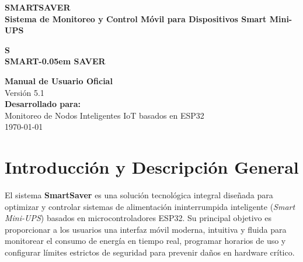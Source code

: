 \documentclass[11pt,a4paper]{article}
\begin{document}

\begin{titlepage}
    \centering
    \vspace*{2cm}
    {\Huge \bfseries \color{primaryblue} SMARTSAVER} \\[0.4cm]
    {\Large \bfseries \color{darkslate} Sistema de Monitoreo y Control Móvil para Dispositivos Smart Mini-UPS} \\[1.5cm]
    \vspace*{0.5cm}
    \begin{tcolorbox}[colback=primaryblue, colframe=primaryblue, width=4cm, height=4cm, arc=15pt, boxrule=0pt, colupper=white, valign=center, halign=center]
        \centering
        \vspace*{0.5cm}
        {\Huge \bfseries S} \\[0.1cm]
        {\small \bfseries SMART\kern-0.05em SAVER}
    \end{tcolorbox}
    \vspace*{1.5cm}
    
    {\large \textbf{Manual de Usuario Oficial}} \\[0.5cm]
    {\large Versión 5.1} \\[2cm]
    
    \textbf{Desarrollado para:} \\
    Monitoreo de Nodos Inteligentes IoT basados en ESP32 \\[1cm]
    
    \vfill
    {\large \today}
\end{titlepage}

\newpage
\tableofcontents
\newpage
{}

\section{Introducción y Descripción General}
El sistema \textbf{SmartSaver} es una solución tecnológica integral diseñada para optimizar y controlar sistemas de alimentación ininterrumpida inteligente (\textit{Smart Mini-UPS}) basados en microcontroladores ESP32. Su principal objetivo es proporcionar a los usuarios una interfaz móvil moderna, intuitiva y fluida para monitorear el consumo de energía en tiempo real, programar horarios de uso y configurar límites estrictos de seguridad para prevenir daños en hardware crítico.
\end{document}
